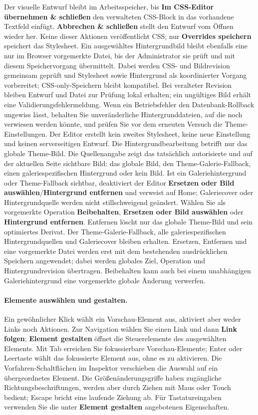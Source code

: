 \documentclass[11pt,a4paper]{article}
\newcommand{\ui}[1]{\textbf{#1}}
\begin{document}
Der visuelle Entwurf bleibt im Arbeitsspeicher, bis \ui{Im CSS-Editor übernehmen
\& schließen} den verwalteten CSS-Block in das vorhandene Textfeld einfügt.
\ui{Abbrechen \& schließen} stellt den Entwurf vom Öffnen wieder her. Keine
dieser Aktionen veröffentlicht CSS; nur \ui{Overrides speichern} speichert das
Stylesheet. Ein ausgewähltes Hintergrundbild bleibt ebenfalls eine nur im
Browser vorgemerkte Datei, bis der Administrator sie prüft und mit diesem
Speichervorgang übermittelt. Dabei werden CSS- und Bildrevision gemeinsam
geprüft und Stylesheet sowie Hintergrund als koordinierter Vorgang vorbereitet;
CSS-only-Speichern bleibt kompatibel. Bei veralteter Revision bleiben Entwurf
und Datei zur Prüfung lokal erhalten; ein ungültiges Bild erhält eine
Validierungsfehlermeldung. Wenn ein Betriebsfehler den Datenbank-Rollback
ungewiss lässt, behalten Sie unveränderliche Hintergrunddateien, auf die noch
verwiesen werden könnte, und prüfen Sie vor dem erneuten Versuch die
Theme-Einstellungen. Der Editor erstellt kein zweites Stylesheet, keine neue
Einstellung und keinen serverseitigen Entwurf.
Die Hintergrundbearbeitung betrifft nur das globale Theme-Bild. Die
Quellenangabe zeigt das tatsächlich autorisierte und auf der aktuellen Seite
sichtbare Bild: das globale Bild, den Theme-Galerie-Fallback, einen
galeriespezifischen Hintergrund oder kein Bild. Ist ein Galeriehintergrund oder
Theme-Fallback sichtbar, deaktiviert der Editor \ui{Ersetzen oder Bild
auswählen}/\ui{Hintergrund entfernen} und verweist auf Home; Galeriecover oder
Hintergrundquelle werden nicht stillschweigend geändert. Wählen Sie als
vorgemerkte Operation \ui{Beibehalten}, \ui{Ersetzen oder Bild auswählen} oder
\ui{Hintergrund entfernen}. Entfernen löscht nur das globale Theme-Bild und sein
optimiertes Derivat. Der Theme-Galerie-Fallback, alle galeriespezifischen
Hintergrundquellen und Galeriecover bleiben erhalten. Ersetzen, Entfernen und
eine vorgemerkte Datei werden erst mit dem bestehenden ausdrücklichen Speichern
angewendet; dabei werden globales Ziel, Operation und Hintergrundrevision
übertragen. Beibehalten kann auch bei einem unabhängigen Galeriehintergrund eine
vorgemerkte globale Änderung verwerfen.
\paragraph{Elemente auswählen und gestalten.} Ein gewöhnlicher Klick wählt ein
Vorschau-Element aus, aktiviert aber weder Links noch Aktionen. Zur Navigation
wählen Sie einen Link und dann \ui{Link folgen}; \ui{Element gestalten} öffnet
die Steuerelemente des ausgewählten Elements. Mit Tab erreichen Sie
fokussierbare Vorschau-Elemente; Enter oder Leertaste wählt das fokussierte
Element aus, ohne es zu aktivieren. Die Vorfahren-Schaltflächen im Inspektor
verschieben die Auswahl auf ein übergeordnetes Element. Die
Größenänderungsgriffe haben zugängliche Richtungsbeschriftungen, werden aber
durch Ziehen mit Maus oder Touch bedient; Escape bricht eine laufende Ziehung
ab. Für Tastatureingaben verwenden Sie die unter \ui{Element gestalten}
angebotenen Eigenschaften.
\end{document}

